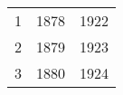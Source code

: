 % 
\begin{tabular}{ccc}
  \hline
  \hline
1 & 1878 & 1922 \\ 
  2 & 1879 & 1923 \\ 
  3 & 1880 & 1924 \\ 
   \hline
\end{tabular}
